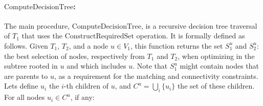    			\paragraph{$\text{ComputeDecisionTree}$:}
   			The main procedure, $\text{ComputeDecisionTree}$,  is a recursive decision tree traversal of $T_1$ that uses the $\text{ConstructRequiredSet}$ operation.
   			It is formally defined as follows.
   			Given $T_1$, $T_2$, and a node $u \in V_1$, this function returns the set $S^u_1$ and $S^u_2$: the best selection of nodes, respectively from $T_1$ and $T_2$, when optimizing in the subtree rooted in $u$ and which includes $u$.
   			Note that $S^u_1$ might contain nodes that are parents to $u$, as a requirement for the matching and connectivity constraints.
   			Lets define $u_i$ the $i$-th children of $u$, and $C^u = \bigcup\limits_i{\{u_i\}}$ the set of these children. %
   			For all nodes $u_i \in C^u$, if any:
